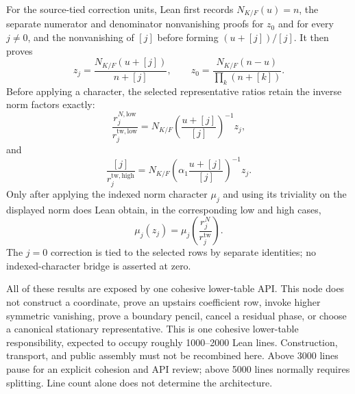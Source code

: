 \begin{lemma}
For the source-tied correction units, Lean first records
$N_{K/F}(u)=n$, the separate numerator and denominator nonvanishing proofs
for $z_0$ and for every $j\ne0$, and the nonvanishing of $[j]$ before forming
$(u+[j])/[j]$.  It then proves
\[
 z_j=\frac{N_{K/F}(u+[j])}{n+[j]},\qquad
 z_0=\frac{N_{K/F}(n-u)}{\prod_k(n+[k])}.
\]
Before applying a character, the selected representative ratios retain the
inverse norm factors exactly:
\[
 \frac{r^{N,\mathrm{low}}_j}{r^{\mathrm{tw},\mathrm{low}}_j}
   =N_{K/F}\!\left(\frac{u+[j]}{[j]}\right)^{-1}z_j,
\]
and
\[
 \frac{[j]}{r^{\mathrm{tw},\mathrm{high}}_j}
   =N_{K/F}\!\left(\alpha _1\frac{u+[j]}{[j]}\right)^{-1}z_j.
\]
Only after applying the indexed norm character $\mu_j$ and using its
triviality on the displayed norm does Lean obtain, in the corresponding low
and high cases,
\[
 \mu_j(z_j)=\mu_j\!\left(
   \frac{r^N_j}{r^{\mathrm{tw}}_j}\right).
\]
The $j=0$ correction is tied to the selected rows by separate identities;
no indexed-character bridge is asserted at zero.

All of these results are exposed by one cohesive lower-table API.  This node
does not construct a coordinate, prove an upstairs coefficient row, invoke
higher symmetric vanishing, prove a boundary pencil, cancel a residual
phase, or choose a canonical stationary representative.
\leanok
{}
\FormalizationContract
This is one cohesive lower-table responsibility, expected to occupy roughly
1000--2000 Lean lines.  Construction, transport, and public assembly must not
be recombined here.  Above 3000 lines pause for an explicit cohesion and API
review; above 5000 lines normally requires splitting.  Line count alone does
not determine the architecture.
\end{lemma}
